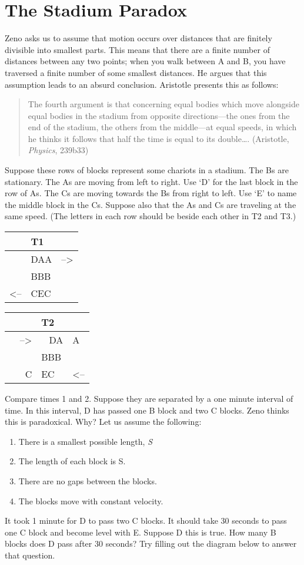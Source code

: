 \documentclass[oneside]{article}
\begin{document}
\section{The Stadium Paradox}\label{stadium-paradox}

Zeno asks us to assume that motion occurs over distances that are finitely divisible into smallest parts. This means that there are a finite number of distances between any two points; when you walk between A and B, you have traversed a finite number of some smallest distances. He argues that this assumption leads to an absurd conclusion. Aristotle presents this as follows: 



\begin{quote}
The fourth argument is that concerning equal bodies which move alongside equal bodies in the stadium from opposite directions---the ones from the end of the stadium, the others from the middle---at equal speeds, in which he thinks it follows that half the time is equal to its
double\ldots{}. (Aristotle, \emph{Physics}, 239b33)
\end{quote}
Suppose these rows of blocks represent some chariots in a stadium. The
Bs are stationary. The As are moving from left to right. Use `D' for the last block in the row of As. The Cs are moving towards the Bs from right to left. Use `E' to name the middle block in the Cs. Suppose also that the As and Cs are traveling at the same speed. (The letters in each row should be beside each other in T2 and T3.)

\begin{longtable}[c]{@{}lll@{}}
\toprule
& T1 &\tabularnewline
\midrule
\endhead
& DAA & --\textgreater{}\tabularnewline
& BBB &\tabularnewline
\textless{}-- & CEC &\tabularnewline
\end{longtable}

\begin{longtable}[c]{@{}rll@{}}
\toprule
& T2 &\tabularnewline
\midrule
\endhead
--\textgreater{} & ~ DA & A\tabularnewline
& BBB &\tabularnewline
~ ~ C & EC~ & \textless{}--\tabularnewline
\end{longtable}
Compare times 1 and 2. Suppose they are separated by a one minute
interval of time. In this interval, D has passed one B block and two C blocks. Zeno thinks this is paradoxical. Why? Let us assume the following:

\begin{enumerate}
\item
  There is a smallest possible length, \emph{S}
\item
  The length of each block is S.
\item
  There are no gaps between the blocks.
\item
  The blocks move with constant velocity.
\end{enumerate}
It took 1 minute for D to pass two C blocks. It should take 30 seconds to
pass one C block and become level with E. Suppose D this is true. How many B blocks does D pass after 30 seconds?  Try filling out the diagram below to answer that question.
\end{document}
